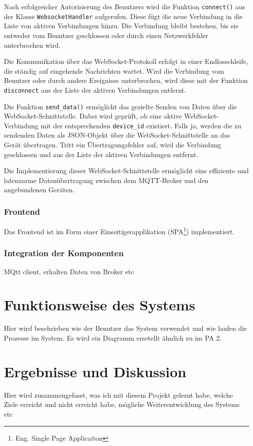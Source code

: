 \documentclass[12pt, letterpaper]{article}
\begin{document}
  \par Nach erfolgreicher Autorisierung des Benutzers wird die Funktion \texttt{connect()} aus der Klasse \texttt{WebsocketHandler} aufgerufen. Diese fügt die neue Verbindung in die Liste von aktiven Verbindungen hinzu. Die Verbindung bleibt bestehen, bis sie entweder vom Benutzer geschlossen oder durch einen Netzwerkfehler unterbrochen wird.
  \par Die Kommunikation über das WebSocket-Protokoll erfolgt in einer Endlosschleife, die ständig auf eingehende Nachrichten wartet. Wird die Verbindung vom Benutzer oder durch andere Ereignisse unterbrochen, wird diese mit der Funktion \texttt{disconnect} aus der Liste der aktiven Verbindungen entfernt.
  \par Die Funktion \texttt{send\_data()} ermöglicht das gezielte Senden von Daten über die WebSocket-Schnittstelle. Dabei wird geprüft, ob eine aktive WebSocket-Verbindung mit der entsprechenden \texttt{device\_id} existiert. Falls ja, werden die zu sendenden Daten als JSON-Objekt über die WebSocket-Schnittstelle an das Gerät übertragen. Tritt ein Übertragungsfehler auf, wird die Verbindung geschlossen und aus der Liste der aktiven Verbindungen entfernt.
  \par Die Implementierung dieser WebSocket-Schnittstelle ermöglicht eine effiziente und latenzarme Datenübertragung zwischen dem MQTT-Broker und den angebundenen Geräten.
  \subsubsection{Frontend}
  \par Das Frontend ist im Form einer Einseitigerapplikation (SPA\footnote{Eng. Single Page Applicaiton}) implementiert. 
  \subsubsection{Integration der Komponenten}
  \par MQtt client, erhalten Daten von Broker etc

\newpage
\section{Funktionsweise des Systems}
\par Hier wird beschrieben wie der Benutzer das System verwendet und wie laufen die Prozesse im System. Es wird ein Diagramm ersetellt ähnlich zu im PA 2. 
\section{Ergebnisse und Diskussion}
\par Hier wird zusammengefasst, was ich mit diesem Projekt gelernt habe, welche Ziele erreicht und nicht erreicht habe, mögliche Weiterentwicklung des Systems etc
\newpage
\end{document}
